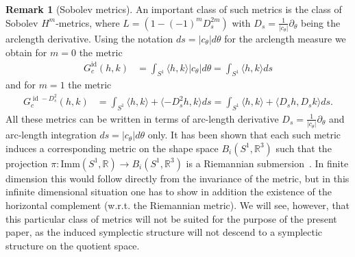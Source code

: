 \documentclass[12pt]{amsart}
\newcommand{\rev}[1]{#1}
\theoremstyle{definition}
\newtheorem{remark}[theorem]{Remark}
\newcommand{\R}{\mathbb R}
\newcommand{\Imm}{\mathrm{Imm}}
\def\R{{\mathbb R}}
\begin{document}
\begin{remark}[Sobolev metrics]\label{rem:Sobmetric}
An important class of such metrics is the class of Sobolev $H^m$-metrics,
where $L=(1-(-1)^m D_s^{2m})$ with $D_s=\frac1{|c_\theta|}\partial_{\theta}$ being the arclength derivative. 
Using the notation $ds=|c_\theta|d\theta$ for the arclength measure  we 
obtain for $m=0$ the metric
\begin{align}
  G_c^{\operatorname{id}}(h,k)&= \int_{S^1} \langle h,k\rangle |\rev{c_\theta}| d\theta=\int_{S^1} \langle h,k\rangle ds  
\end{align}  
and for $m=1$ the metric
\begin{align}
  G_c^{\operatorname{id}-D_s^2}(h,k)&
  = \int_{S^1} \langle h,k\rangle  +\langle - D_s^2 h, k \rangle ds
  = \int_{S^1} \langle h,k\rangle  +\langle D_s h,D_s k \rangle ds.
\end{align}
All these metrics can be written in terms of arc-length derivative \rev{$D_s=\frac{1}{|c_\theta|}\partial_\theta$} and arc-length integration $ds=|c_\theta|d\theta$ only. It has been shown that each such metric induces a corresponding metric on the shape space $B_i(S^1,\R^3)$ such that the projection \rev{$\pi:\Imm(S^1,\R)\to B_i(S^1,\R^3)$} is a Riemannian submersion~\cite{michor_mumford2007}. In finite dimension this would follow directly from the invariance of the metric, but in this infinite dimensional situation one has to show in addition the existence of the horizontal complement (w.r.t. the Riemannian metric). We will see, however, that this particular class of metrics will not be suited for the purpose of the present paper, as the induced symplectic structure will not descend to a symplectic structure on the quotient space. 
\end{remark}
\end{document}
